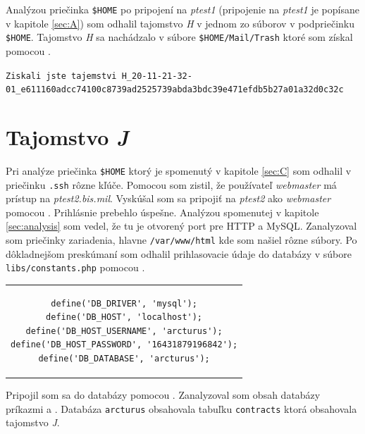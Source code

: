\documentclass[11pt,a4paper]{article}
\begin{document}
Analýzou priečinka \texttt{\$HOME} po pripojení na \textit{ptest1} (pripojenie na \textit{ptest1} je popísane v kapitole \ref{sec:A}) som odhalil tajomstvo \textit{H} v jednom zo súborov v podpriečinku \texttt{\$HOME}. Tajomstvo \textit{H} sa nachádzalo v súbore \texttt{\$HOME/Mail/Trash} ktoré som získal pomocou .

\begin{center}
\small{\texttt{Ziskali jste tajemstvi H\_20-11-21-32-01\_e611160adcc74100c8739ad2525739abda3bdc39e471efdb5b27a01a32d0c32c}}
\end{center}

\section{Tajomstvo \textit{J}}\label{sec:J}

Pri analýze priečinka \texttt{\$HOME} ktorý je spomenutý v kapitole \ref{sec:C} som odhalil v priečinku \texttt{.ssh} rôzne kľúče. Pomocou  som zistil, že používateľ \textit{webmaster} má prístup na \textit{ptest2.bis.mil}. Vyskúšal som sa pripojiť na \textit{ptest2} ako \textit{webmaster} pomocou . Prihlásnie prebehlo úspešne. Analýzou spomenutej v kapitole \ref{sec:analysis} som vedel, že tu je otvorený port pre HTTP a MySQL. Zanalyzoval som priečinky zariadenia, hlavne \texttt{/var/www/html} kde som našiel rôzne súbory. Po dôkladnejšom preskúmaní som odhalil prihlasovacie údaje do databázy v súbore \texttt{libs/constants.php} pomocou .

\begin{center}
\begin{tabular}{c}
\begin{lstlisting}[basicstyle=\footnotesize]
define('DB_DRIVER', 'mysql');
define('DB_HOST', 'localhost');
define('DB_HOST_USERNAME', 'arcturus');
define('DB_HOST_PASSWORD', '16431879196842');
define('DB_DATABASE', 'arcturus');
\end{lstlisting}
\end{tabular}
\end{center}

 Pripojil som sa do databázy pomocou . Zanalyzoval som obsah databázy príkazmi  a . Databáza \texttt{arcturus} obsahovala tabuľku \texttt{contracts} ktorá obsahovala tajomstvo \textit{J}.
\end{document}
